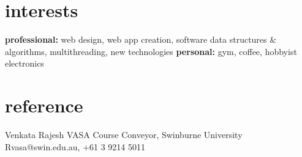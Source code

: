 \documentclass[]{friggeri-cv} %
\begin{document}
\section{interests}

\textbf{professional:} web design, web app creation, software data structures \& algorithms, multithreading, new technologies \textbf{personal:} gym, coffee, hobbyist electronics


\section{reference}

\begin{entrylist}
\entry
{}
{Venkata Rajesh VASA}
{Course Conveyor, Swinburne University}
{Rvasa@swin.edu.au, +61 3 9214 5011}
\end{entrylist}
\end{document}
